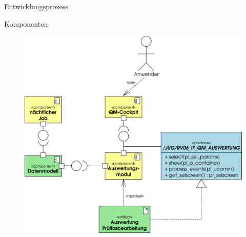 \begin{frame}{Entwicklungsprozess}
\begin{overlayarea}{\textwidth}{\textheight}
 \end{overlayarea}
\end{frame}
\begin{frame}{Komponenten}
\begin{figure}[tb]
\includegraphics[width=.9\textwidth]{Komponenten}
\end{figure}
\end{frame}
